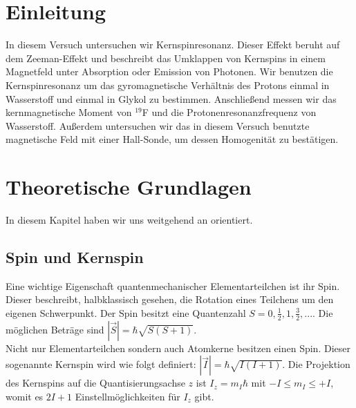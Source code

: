 \documentclass[12pt]{article}
\title{\vspace{0cm}{\Huge Fortgeschrittenen-Praktikum I:\\ \vspace{1cm} Kernspinresonanz}}
\author{Saskia Bondza\\Simon Stephan}
\date{durchgeführt am 15.09.2016}
\begin{document}
\maketitle
\newpage

\thispagestyle{empty}
\tableofcontents
\newpage

\section{Einleitung}

In diesem Versuch untersuchen wir Kernspinresonanz. Dieser Effekt beruht auf dem Zeeman-Effekt und beschreibt das Umklappen von Kernspins in einem Magnetfeld unter Absorption oder Emission von Photonen. Wir benutzen die Kernspinresonanz um das gyromagnetische Verhältnis des Protons einmal in Wasserstoff und einmal in Glykol zu bestimmen. Anschließend messen wir das kernmagnetische Moment von $^{19}$F und die Protonenresonanzfrequenz von Wasserstoff. Außerdem untersuchen wir das in diesem Versuch benutzte magnetische Feld mit einer Hall-Sonde, um dessen Homogenität zu bestätigen.


\newpage
\section{Theoretische Grundlagen}
In diesem Kapitel haben wir uns weitgehend an \cite{anleitung} orientiert.
\subsection{Spin und Kernspin}
Eine wichtige Eigenschaft quantenmechanischer Elementarteilchen ist ihr Spin. Dieser beschreibt, halbklassisch gesehen, die Rotation eines Teilchens um den eigenen Schwerpunkt. Der Spin besitzt eine Quantenzahl $S=0,\frac12,1,\frac32,...$. Die möglichen Beträge sind $|\vec S|=\hbar\sqrt{S(S+1)}$.\\

Nicht nur Elementarteilchen sondern auch Atomkerne besitzen einen Spin. Dieser sogenannte Kernspin wird wie folgt definiert: $|\vec I|=\hbar\sqrt{I(I+1)}$. Die Projektion des Kernspins auf die Quantisierungsachse $z$ ist $I_z=m_I\hbar$ mit $-I\leq m_I\leq +I$, womit es $2I+1$ Einstellmöglichkeiten für $I_z$ gibt.\\
\end{document}
